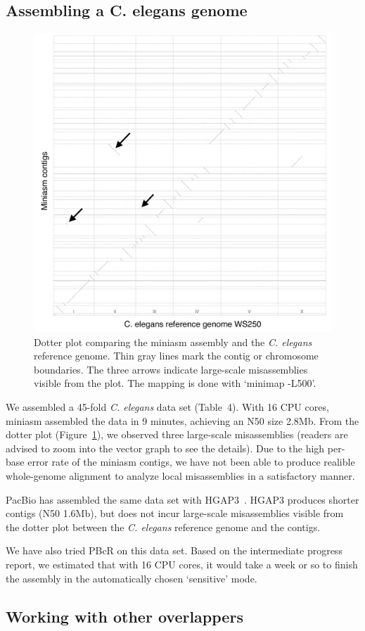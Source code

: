 \documentclass{bioinfo}
\begin{document}
\subsection{Assembling a C. elegans genome}

\begin{figure}[tb]
\includegraphics[width=.48\textwidth]{ce}
\caption{Dotter plot comparing the miniasm assembly and the {\it C. elegans}
reference genome. Thin gray lines mark the contig or chromosome boundaries. The
three arrows indicate large-scale misassemblies visible from the
plot. The mapping is done with `minimap -L500'.}\label{fig:ce}
\end{figure}

We assembled a 45-fold {\it C. elegans} data set (Table~4). With 16 CPU cores,
miniasm assembled the data in 9 minutes, achieving an N50 size 2.8Mb. From the
dotter plot (Figure~\ref{fig:ce}), we observed three large-scale misassemblies
(readers are advised to zoom into the vector graph to see the details).  Due to
the high per-base error rate of the miniasm contigs, we have not been able to
produce realible whole-genome alignment to analyze local misassemblies in a
satisfactory manner.

PacBio has assembled the same data set with HGAP3~\citep{Chin:2013qr}. HGAP3
produces shorter contigs (N50 1.6Mb), but does not incur large-scale
misassemblies visible from the dotter plot between the {\it C. elegans}
reference genome and the contigs.

We have also tried PBcR on this data set. Based on the intermediate progress
report, we estimated that with 16 CPU cores, it would take a week or so to
finish the assembly in the automatically chosen `sensitive' mode.

\subsection{Working with other overlappers}
\end{document}
